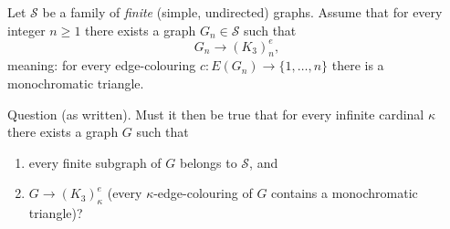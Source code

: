 Let $\mathcal S$ be a family of \emph{finite} (simple, undirected) graphs.
Assume that for every integer $n\ge 1$ there exists a graph $G_n\in\mathcal S$ such that
\[
  G_n \to (K_3)^{e}_n,
\]
meaning: for every edge-colouring $c:E(G_n)\to\{1,\dots,n\}$ there is a monochromatic triangle.

Question (as written). Must it then be true that for every infinite cardinal $\kappa$ there exists a graph $G$ such that

\begin{enumerate}[label=(\alph*)]
\item every finite subgraph of $G$ belongs to $\mathcal S$, and
\item $G\to (K_3)^{e}_\kappa$ (every $\kappa$-edge-colouring of $G$ contains a monochromatic triangle)?
\end{enumerate}
